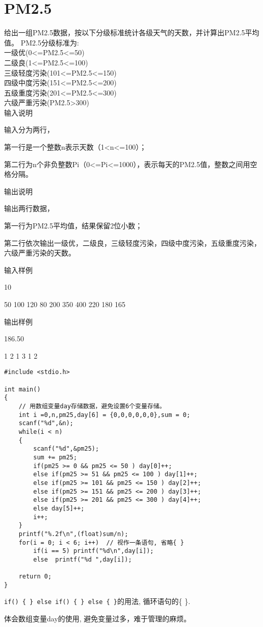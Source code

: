 \section{PM2.5}
给出一组PM2.5数据，按以下分级标准统计各级天气的天数，并计算出PM2.5平均值。
PM2.5分级标准为:\\
一级优(0<=PM2.5<=50)\\
二级良(1<=PM2.5<=100)\\
三级轻度污染(101<=PM2.5<=150)\\
四级中度污染(151<=PM2.5<=200)\\
五级重度污染(201<=PM2.5<=300)\\
六级严重污染(PM2.5>300)\\

输入说明
	
输入分为两行，

第一行是一个整数n表示天数（1<n<=100）；

第二行为n个非负整数Pi（0<=Pi<=1000），表示每天的PM2.5值，整数之间用空格分隔。

输出说明
	
输出两行数据，

第一行为PM2.5平均值，结果保留2位小数；

第二行依次输出一级优，二级良，三级轻度污染，四级中度污染，五级重度污染，六级严重污染的天数。

输入样例
	
10

50 100 120 80 200 350 400 220 180 165

输出样例	

186.50

1 2 1 3 1 2

\begin{lstlisting}
#include <stdio.h>

int main()
{
	// 用数组变量day存储数据，避免设置6个变量存储。
	int i =0,n,pm25,day[6] = {0,0,0,0,0,0},sum = 0;
	scanf("%d",&n);
	while(i < n) 
	{
		scanf("%d",&pm25);
		sum += pm25;
		if(pm25 >= 0 && pm25 <= 50 ) day[0]++;
		else if(pm25 >= 51 && pm25 <= 100 ) day[1]++;
		else if(pm25 >= 101 && pm25 <= 150 ) day[2]++;
		else if(pm25 >= 151 && pm25 <= 200 ) day[3]++;
		else if(pm25 >= 201 && pm25 <= 300 ) day[4]++;
		else day[5]++;
		i++;
	} 
	printf("%.2f\n",(float)sum/n);
	for(i = 0; i < 6; i++)  // 视作一条语句, 省略{ }
		if(i == 5) printf("%d\n",day[i]);
		else  printf("%d ",day[i]);
	
	return 0;
} 
\end{lstlisting}

\begin{note}[要点]
	\lstinline|if() { } else if() { } else { }|的用法, 循环语句的\{ \}.
	
	体会数组变量day的使用, 避免变量过多，难于管理的麻烦。
\end{note}

